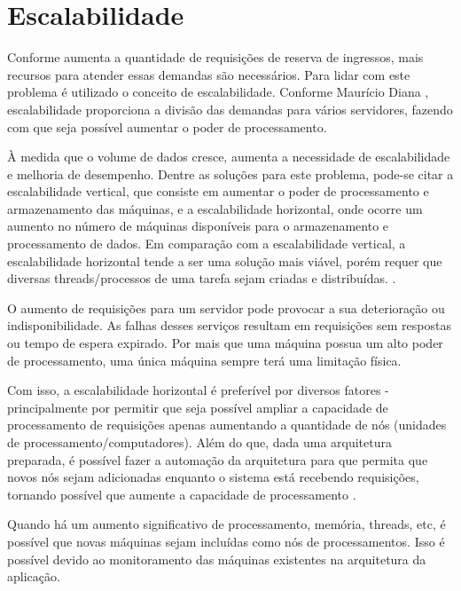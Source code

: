 \chapter{Escalabilidade}\label{escalabilidade}

Conforme aumenta a quantidade de requisições de reserva de ingressos, mais recursos
para atender essas demandas são necessários.
Para lidar com este problema é utilizado o conceito de escalabilidade.
Conforme Maurício Diana \cite[5]{diss-mdediana-2013}, escalabilidade proporciona
a divisão das demandas para vários servidores, fazendo com que seja possível aumentar
o poder de processamento.


\begin{citacao}

À medida que o volume de dados cresce, aumenta a
necessidade de escalabilidade e melhoria de desempenho. Dentre as soluções para este
problema, pode-se citar a escalabilidade vertical, que consiste em aumentar o poder de
processamento e armazenamento das máquinas, e a escalabilidade horizontal, onde ocorre um
aumento no número de máquinas disponíveis para o armazenamento e processamento de
dados. Em comparação com a escalabilidade vertical, a escalabilidade horizontal tende a ser
uma solução mais viável, porém requer que diversas threads/processos de uma tarefa sejam
criadas e distribuídas. \cite[3]{alexandre-morais-souza-2013}.

\end{citacao}

O aumento de requisições para um servidor pode provocar a sua deterioração ou indisponibilidade.
As falhas desses serviços resultam em requisições sem respostas ou tempo de espera expirado.
Por mais que uma máquina possua um alto poder de processamento, uma única máquina sempre
terá uma limitação física.

Com isso, a escalabilidade horizontal é preferível por diversos fatores - principalmente por
permitir que seja possível ampliar a capacidade de processamento de requisições
apenas aumentando a quantidade de nós (unidades de processamento/computadores).
Além do que, dada uma arquitetura preparada, é possível fazer a automação da
arquitetura para que permita que novos nós sejam adicionadas enquanto o
sistema está recebendo requisições, tornando possível que aumente a capacidade
de processamento \cite{ivens-oliveira-porto-2009}.

Quando há um aumento significativo de processamento, memória, threads, etc,
é possível que novas máquinas sejam incluídas como nós de processamentos.
Isso é possível devido ao monitoramento das máquinas existentes na arquitetura
da aplicação.

